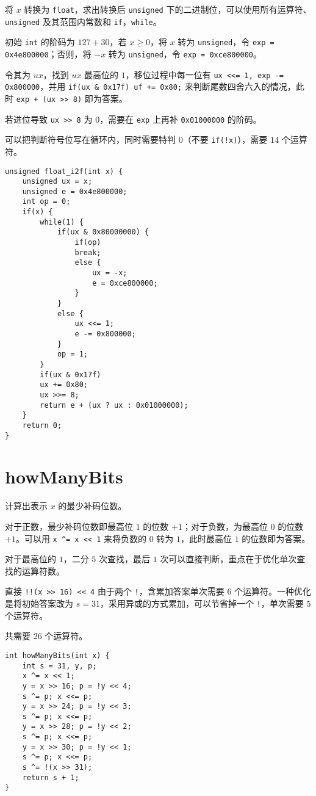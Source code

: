 \documentclass{noithesis}
\begin{document}
	将 $x$ 转换为 \verb|float|，求出转换后 \verb|unsigned| 下的二进制位，可以使用所有运算符、\verb|unsigned| 及其范围内常数和 \verb|if|，\verb|while|。
	
	初始 \verb|int| 的阶码为 $127+30$，若 $x\geq 0$，将 $x$ 转为 \verb|unsigned|，令 \verb|exp = 0x4e800000|；否则，将 $-x$ 转为 \verb|unsigned|，令 \verb|exp = 0xce800000|。
	
	令其为 $ux$，找到 $ux$ 最高位的 $1$，移位过程中每一位有 \verb|ux <<= 1, exp -= 0x800000|，并用 \verb|if(ux & 0x17f) uf += 0x80;| 来判断尾数四舍六入的情况，此时 \verb|exp + (ux >> 8)| 即为答案。
	
	若进位导致 \verb|ux >> 8| 为 $0$，需要在 \verb|exp| 上再补 \verb|0x01000000| 的阶码。
	
	可以把判断符号位写在循环内，同时需要特判 $0$（不要 \verb|if(!x)|），需要 $14$ 个运算符。
\begin{lstlisting}
unsigned float_i2f(int x) {
	unsigned ux = x;
	unsigned e = 0x4e800000;
	int op = 0;
	if(x) {
		while(1) {
			if(ux & 0x80000000) {
				if(op)
				break;
				else {
					ux = -x;
					e = 0xce800000;
				}
			}
			else {
				ux <<= 1;
				e -= 0x800000;
			}
			op = 1;
		}
		if(ux & 0x17f)
		ux += 0x80;
		ux >>= 8;
		return e + (ux ? ux : 0x01000000);
	}
	return 0;
}
\end{lstlisting}
	
	\section{howManyBits}
	
	计算出表示 $x$ 的最少补码位数。
	
	对于正数，最少补码位数即最高位 $1$ 的位数 $+1$；对于负数，为最高位 $0$ 的位数 $+1$。可以用 \verb|x ^= x << 1| 来将负数的 $0$ 转为 $1$，此时最高位 $1$ 的位数即为答案。
	
	对于最高位的 $1$，二分 $5$ 次查找，最后 $1$ 次可以直接判断，重点在于优化单次查找的运算符数。
	
	直接 \verb|!!(x >> 16) << 4| 由于两个 \verb|!|，含累加答案单次需要 $6$ 个运算符。一种优化是将初始答案改为 $s=31$，采用异或的方式累加，可以节省掉一个 \verb|!|，单次需要 $5$ 个运算符。
	
	共需要 $26$ 个运算符。
\begin{lstlisting}
int howManyBits(int x) {
	int s = 31, y, p;
	x ^= x << 1;
	y = x >> 16; p = !y << 4;
	s ^= p; x <<= p;
	y = x >> 24; p = !y << 3;
	s ^= p; x <<= p;
	y = x >> 28; p = !y << 2;
	s ^= p; x <<= p;
	y = x >> 30; p = !y << 1;
	s ^= p; x <<= p;
	s ^= !(x >> 31);
	return s + 1;
}
\end{lstlisting}
	
\end{document}
